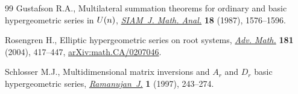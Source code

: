 \documentclass[11pt]{article}
\numberwithin{equation}{section}
\begin{document}
\begin{thebibliography}{99}
Gustafson R.A., Multilateral summation theorems for ordinary and basic
 hypergeometric series in {${\rm U}(n)$}, \href{https://doi.org/10.1137/0518114}{\textit{SIAM~J. Math. Anal.}}
 \textbf{18} (1987), 1576--1596.

Rosengren H., Elliptic hypergeometric series on root systems, \href{https://doi.org/10.1016/S0001-8708(03)00071-9}{\textit{Adv.
 Math.}} \textbf{181} (2004), 417--447, \href{https://arxiv.org/abs/math.CA/0207046}{arXiv:math.CA/0207046}.

Schlosser M.J., Multidimensional matrix inversions and {$A_r$} and {$D_r$}
 basic hypergeometric series, \href{https://doi.org/10.1023/A:1009705129155}{\textit{Rama\-nujan~J.}} \textbf{1} (1997),
 243--274.

\end{thebibliography}
\end{document}
